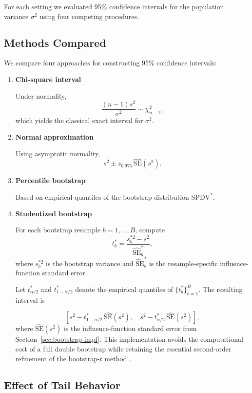 \documentclass[12pt,a4paper]{article}
\begin{document}
For each setting we evaluated 95\% confidence intervals for the population
variance $\sigma^2$ using four competing procedures.

\subsection{Methods Compared}
\label{sec:methods-compared}

We compare four approaches for constructing 95\% confidence intervals:

\begin{enumerate}

\item \textbf{Chi-square interval}

Under normality,
\[
\frac{(n-1)s^2}{\sigma^2} \sim \chi^2_{n-1},
\]
which yields the classical exact interval for $\sigma^2$.

\item \textbf{Normal approximation}

Using asymptotic normality,
\[
s^2 \pm z_{0.975}\,\widehat{\mathrm{SE}}(s^2).
\]

\item \textbf{Percentile bootstrap}

Based on empirical quantiles of the bootstrap distribution
$\text{SPDV}^*$.

\item \textbf{Studentized bootstrap}

For each bootstrap resample $b=1,\dots,B$, compute
\[
t_b^* =
\frac{s_b^{*2}-s^2}{\widehat{\mathrm{SE}}_b^*},
\]
where $s_b^{*2}$ is the bootstrap variance and
$\widehat{\mathrm{SE}}_b^*$ is the resample-specific
influence-function standard error.

Let $t^*_{\alpha/2}$ and $t^*_{1-\alpha/2}$ denote the empirical
quantiles of $\{t_b^*\}_{b=1}^B$. The resulting interval is


\[
\left[
s^2 - t^*_{1-\alpha/2}\,\widehat{\mathrm{SE}}(s^2),
\quad
s^2 - t^*_{\alpha/2}\,\widehat{\mathrm{SE}}(s^2)
\right],
\]
where $\widehat{\mathrm{SE}}(s^2)$ is the influence-function standard error from Section~\ref{sec:bootstrap-impl}. 
This implementation avoids the computational cost of a full double
bootstrap while retaining the essential second-order refinement of the
bootstrap-$t$ method \citep{hall1992,efron1993,davison1997}.

\end{enumerate}

\subsection{Effect of Tail Behavior}
\end{document}
